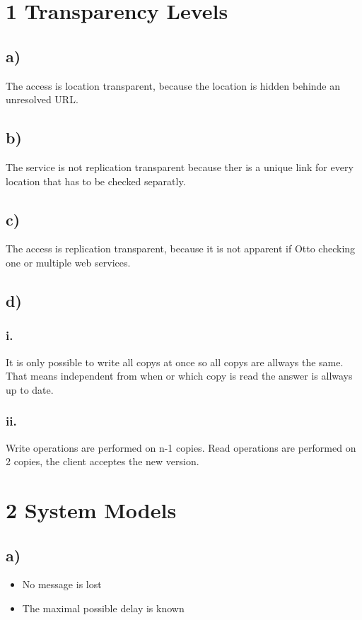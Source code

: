 \documentclass{scrartcl}
\author{Felix Bühler\\2973410 \and Clemens Lieb\\xxxxxxx \and Steffen Wonner\\2862123 \and Fabian Bühler\\xxxxxxx}
\title{\gettitle}
\subtitle{\getsubtitle}
\begin{document}
\maketitle

\section*{1 Transparency Levels}
\subsection*{a)}
The access is location transparent, because the location is hidden behinde an unresolved URL. 
\subsection*{b)}
The service is not replication transparent because ther is a unique link for every location that has to be checked separatly.
\subsection*{c)}
The access is replication transparent, because it is not apparent if Otto checking one or multiple web services. 
\subsection*{d)}
\subsubsection*{i.}
It is only possible to write all copys at once so all copys are allways the same. That means independent from when or which copy is read the answer is allways up to date.
\subsubsection*{ii.}
Write operations are performed on n-1 copies.
Read operations are performed on 2 copies, the client acceptes the new version. 

\section*{2 System Models}
\subsection*{a)}
\begin{itemize}
	\item No message is lost
	\item The maximal possible delay is known
\end{itemize}
\end{document}
